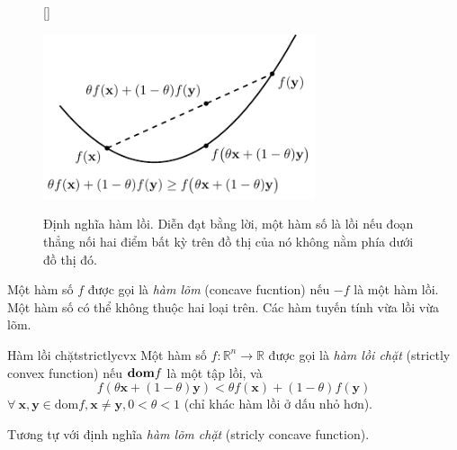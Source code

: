 \begin{figure}[t]
    [\FBwidth]
    {\caption{Định nghĩa hàm lồi. Diễn đạt bằng lời, một hàm số là lồi nếu đoạn thẳng nối hai điểm bất kỳ trên đồ thị của nó {không nằm phía dưới} đồ thị đó. }
    \label{fig:16_convexf_def}}
    {\includegraphics[width=8cm]{Chapters/08_ConvexOptimization/16_convexity/latex/convexf_def.pdf}}
\end{figure}



Một hàm số $f$ được gọi là \textit{hàm lõm} (concave fucntion) nếu $-f$
là một hàm lồi. Một
hàm số có thể không thuộc hai loại trên. Các hàm tuyến tính vừa lồi vừa lõm.
\begin{mydef}{Hàm lồi chặt}{strictlycvx}
 Một hàm số $f: \mathbb{R}^n \rightarrow \mathbb{R} $ được gọi là
 \textit{hàm lồi chặt} ({strictly convex function}) nếu $\boldsymbol{\mathbf{dom}} f$ là một
 {tập lồi}, và
\begin{equation*} 
f(\theta\mathbf{x} + (1 - \theta) \mathbf{y}) < \theta f(\mathbf{x}) + (1 - \theta)f(\mathbf{y}) 
\end{equation*} 
 $\forall~\mathbf{x, y} \in \text{dom}f, \mathbf{x} \neq \mathbf{y},  0 < \theta
< 1$ (chỉ khác hàm lồi ở dấu nhỏ hơn).

\end{mydef}

Tương tự với định nghĩa \textit{hàm lõm chặt} (stricly concave function). 
 
